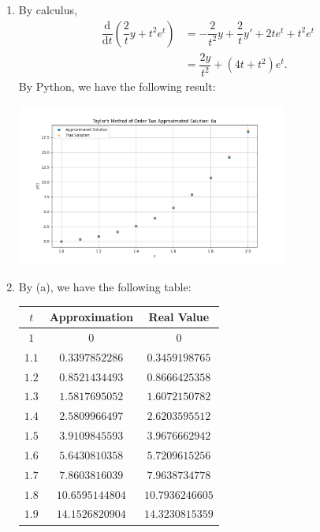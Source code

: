 \documentclass[11pt]{article}
\theoremstyle{break}
\newcommand{\dd}{\text{d}}
\numberwithin{equation}{theorem}
\begin{document}
\begin{enumerate}
    \item By calculus, \begin{align*}
        \dfrac{\dd}{\dd t}\left(\dfrac{2}{t}y+t^2e^t\right)&=-\dfrac{2}{t^2}y+\dfrac{2}{t}y'+2te^t+t^2e^t\\
        &=\dfrac{2y}{t^2}+(4t+t^2)e^t.
    \end{align*}
    By Python, we have the following result:
    \begin{center}
        \includegraphics[width=0.7\textwidth]{P6a.png}
    \end{center}
    \item By (a), we have the following table:
    \begin{center}
        \begin{tabular}{|c|c|c|}
            \hline
            $t$ & Approximation & Real Value \\
            \hline
            $1$ & $0$ & $0$ \\
            \hline
            $1.1$ & $0.3397852286$ & $0.3459198765$ \\
            \hline
            $1.2$ & $0.8521434493$ & $0.8666425358$ \\
            \hline
            $1.3$ & $1.5817695052$ & $1.6072150782$ \\
            \hline
            $1.4$ & $2.5809966497$ & $2.6203595512$ \\
            \hline
            $1.5$ & $3.9109845593$ & $3.9676662942$ \\
            \hline
            $1.6$ & $5.6430810358$ & $5.7209615256$ \\
            \hline
            $1.7$ & $7.8603816039$ & $7.9638734778$ \\
            \hline
            $1.8$ & $10.6595144804$ & $10.7936246605$ \\
            \hline
            $1.9$ & $14.1526820904$ & $14.3230815359$ \\

\end{tabular}
\end{center}
\end{enumerate}
\end{document}

